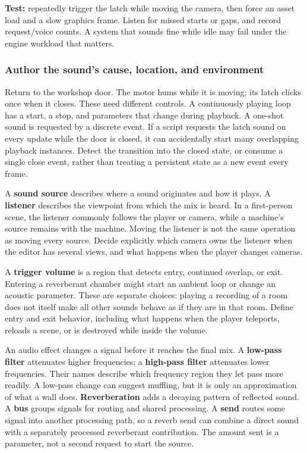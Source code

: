 \textbf{Test:} repeatedly trigger the latch while moving the camera, then force an asset load and a slow graphics frame. Listen for missed starts or gaps, and record request/voice counts. A system that sounds fine while idle may fail under the engine workload that matters.

\subsubsection{Author the sound's cause, location, and environment}\label{06-engine-ii-ch040-author-the-sounds-cause-location-and-environment}

\hypertarget{06-engine-ii-ch040-author-the-sounds-cause-location-and-environment}{}

Return to the workshop door. The motor hums while it is moving; its latch clicks once when it closes. These need different controls. A continuously playing loop has a start, a stop, and parameters that change during playback. A one-shot sound is requested by a discrete event. If a script requests the latch sound on every update while the door is closed, it can accidentally start many overlapping playback instances. Detect the transition into the closed state, or consume a single close event, rather than treating a persistent state as a new event every frame.

A \textbf{sound source} describes where a sound originates and how it plays. A \textbf{listener} describes the viewpoint from which the mix is heard. In a first-person scene, the listener commonly follows the player or camera, while a machine's source remains with the machine. Moving the listener is not the same operation as moving every source. Decide explicitly which camera owns the listener when the editor has several views, and what happens when the player changes cameras.

A \textbf{trigger volume} is a region that detects entry, continued overlap, or exit. Entering a reverberant chamber might start an ambient loop or change an acoustic parameter. These are separate choices: playing a recording of a room does not itself make all other sounds behave as if they are in that room. Define entry and exit behavior, including what happens when the player teleports, reloads a scene, or is destroyed while inside the volume.

An audio effect changes a signal before it reaches the final mix. A \textbf{low-pass filter} attenuates higher frequencies; a \textbf{high-pass filter} attenuates lower frequencies. Their names describe which frequency region they let pass more readily. A low-pass change can suggest muffling, but it is only an approximation of what a wall does. \textbf{Reverberation} adds a decaying pattern of reflected sound. A \textbf{bus} groups signals for routing and shared processing. A \textbf{send} routes some signal into another processing path, so a reverb send can combine a direct sound with a separately processed reverberant contribution. The amount sent is a parameter, not a second request to start the source.

